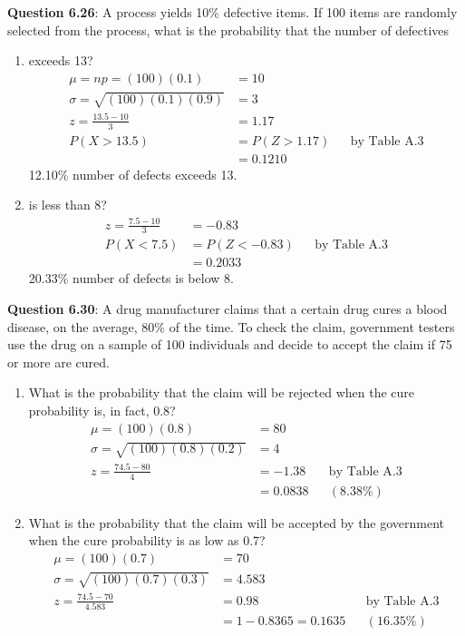 \documentclass{article}
\begin{document}
    \noindent\textbf{Question 6.26}: A process yields 10\% defective items. If 100
    items are randomly selected from the process, what is the probability 
    that the number of defectives
        \begin{enumerate}[label = (\alph*) ]
            \item exceeds 13?
                \begin{align*}
                    \mu = np = (100)(0.1) &= 10\\
                    \sigma = \sqrt{(100)(0.1)(0.9)} &= 3\\
                    z = \frac{13.5-10}{3} &= 1.17\\
                    P(X>13.5) &= P(Z>1.17) &&\text{by Table A.3}\\
                    &= 0.1210
                \end{align*}
            12.10\% number of defects exceeds 13.
            \item is less than 8?
                \begin{align*}
                    z = \frac{7.5 - 10}{3} &= -0.83\\
                    P(X < 7.5) &= P(Z < -0.83)&&\text{by Table A.3} \\
                    &= 0.2033
                \end{align*}
            20.33\% number of defects is below 8.
        \end{enumerate}

    \noindent\textbf{Question 6.30}: A drug manufacturer claims that a certain drug
    cures a blood disease, on the average, 80\% of the time. To check the 
    claim, government testers use the drug on a sample of 100 individuals 
    and decide to accept the claim if 75 or more are cured.
        \begin{enumerate}[label = (\alph*) ]
            \item What is the probability that the claim will be rejected 
            when the cure probability is, in fact, 0.8?
                \begin{align*}
                    \mu = (100)(0.8) &= 80\\
                    \sigma = \sqrt{(100)(0.8)(0.2)} &= 4\\
                    z = \frac{74.5-80}{4} &= -1.38 &&\text{by Table A.3}\\
                    &= 0.0838 && (8.38\%)
                \end{align*}
            \item What is the probability that the claim will be accepted 
            by the government when the cure probability is as low as 0.7?
                \begin{align*}
                    \mu = (100)(0.7) &= 70\\
                    \sigma = \sqrt{(100)(0.7)(0.3)} &= 4.583\\
                    z = \frac{74.5-70}{4.583} &= 0.98 &&\text{by Table A.3}\\
                    &= 1 - 0.8365 = 0.1635 && (16.35\%)
                \end{align*}
        \end{enumerate}
\end{document}
